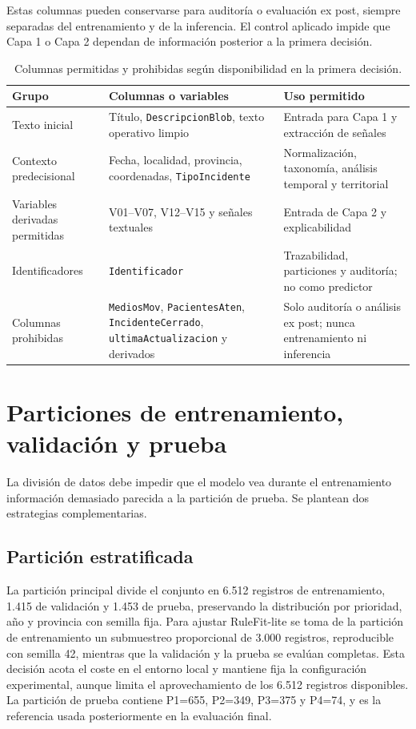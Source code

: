Estas columnas pueden conservarse para auditoría o evaluación ex post, siempre separadas del entrenamiento y de la inferencia. El control aplicado impide que Capa 1 o Capa 2 dependan de información posterior a la primera decisión.

\begin{table}[htbp]
\centering
\scriptsize
\begin{tabular}{|p{3.4cm}|p{4.6cm}|p{5.1cm}|}
\hline
\textbf{Grupo} & \textbf{Columnas o variables} & \textbf{Uso permitido} \\ \hline
Texto inicial & Título, \texttt{DescripcionBlob}, texto operativo limpio & Entrada para Capa 1 y extracción de señales \\ \hline
Contexto predecisional & Fecha, localidad, provincia, coordenadas, \texttt{TipoIncidente} & Normalización, taxonomía, análisis temporal y territorial \\ \hline
Variables derivadas permitidas & V01--V07, V12--V15 y señales textuales & Entrada de Capa 2 y explicabilidad \\ \hline
Identificadores & \texttt{Identificador} & Trazabilidad, particiones y auditoría; no como predictor \\ \hline
Columnas prohibidas & \texttt{MediosMov}, \texttt{PacientesAten}, \texttt{IncidenteCerrado}, \texttt{ultimaActualizacion} y derivados & Solo auditoría o análisis ex post; nunca entrenamiento ni inferencia \\ \hline
\end{tabular}
\caption{Columnas permitidas y prohibidas según disponibilidad en la primera decisión.}
\label{tab:permitidas-prohibidas-leakage-cap7}
\end{table}

\section{Particiones de entrenamiento, validación y prueba}

La división de datos debe impedir que el modelo vea durante el entrenamiento información demasiado parecida a la partición de prueba. Se plantean dos estrategias complementarias.

\subsection{Partición estratificada}

La partición principal divide el conjunto en 6.512 registros de entrenamiento, 1.415 de validación y 1.453 de prueba, preservando la distribución por prioridad, año y provincia con semilla fija. Para ajustar RuleFit-lite se toma de la partición de entrenamiento un submuestreo proporcional de 3.000 registros, reproducible con semilla 42, mientras que la validación y la prueba se evalúan completas. Esta decisión acota el coste en el entorno local y mantiene fija la configuración experimental, aunque limita el aprovechamiento de los 6.512 registros disponibles. La partición de prueba contiene P1=655, P2=349, P3=375 y P4=74, y es la referencia usada posteriormente en la evaluación final.

